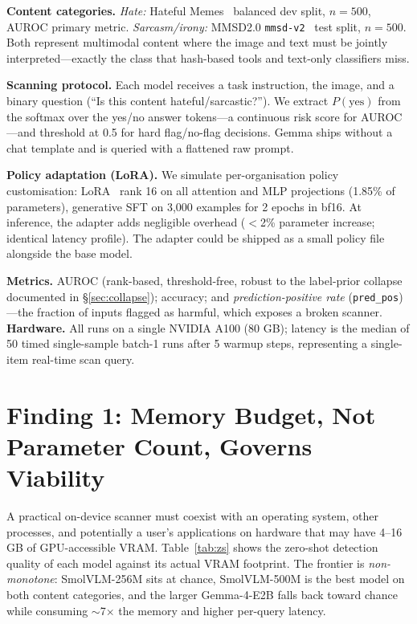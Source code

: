 \documentclass[sigconf,nonacm]{acmart}
\begin{document}
\textbf{Content categories.} \emph{Hate:} Hateful Memes~\cite{kiela2020hateful} balanced
dev split, $n{=}500$, AUROC primary metric. \emph{Sarcasm/irony:} MMSD2.0
\texttt{mmsd-v2}~\cite{qin2023mmsd2} test split, $n{=}500$. Both represent multimodal
content where the image and text must be jointly interpreted---exactly the class that
hash-based tools and text-only classifiers miss.

\textbf{Scanning protocol.} Each model receives a task instruction, the image, and a binary
question (``Is this content hateful/sarcastic?''). We extract $P(\text{yes})$ from the
softmax over the yes/no answer tokens---a continuous risk score for AUROC---and threshold
at 0.5 for hard flag/no-flag decisions. Gemma ships without a chat template and is queried
with a flattened raw prompt.

\textbf{Policy adaptation (LoRA).} We simulate per-organisation policy customisation:
LoRA~\cite{hu2022lora} rank 16 on all attention and MLP projections (1.85\% of parameters),
generative SFT on 3{,}000 examples for 2 epochs in bf16. At inference, the adapter adds
negligible overhead ($<$2\% parameter increase; identical latency profile). The adapter
could be shipped as a small policy file alongside the base model.

\textbf{Metrics.} AUROC (rank-based, threshold-free, robust to the label-prior collapse
documented in \S\ref{sec:collapse}); accuracy; and \emph{prediction-positive rate}
(\texttt{pred\_pos})---the fraction of inputs flagged as harmful, which exposes a broken
scanner. \textbf{Hardware.} All runs on a single NVIDIA A100 (80 GB); latency is the
median of 50 timed single-sample batch-1 runs after 5 warmup steps, representing a
single-item real-time scan query.

\section{Finding 1: Memory Budget, Not Parameter Count, Governs Viability}\label{sec:scale}
A practical on-device scanner must coexist with an operating system, other processes, and
potentially a user's applications on hardware that may have 4--16 GB of GPU-accessible
VRAM. Table~\ref{tab:zs} shows the zero-shot detection quality of each model against its
actual VRAM footprint. The frontier is \emph{non-monotone}: SmolVLM-256M sits at chance,
SmolVLM-500M is the best model on both content categories, and the larger Gemma-4-E2B
falls back toward chance while consuming $\sim$7$\times$ the memory and higher per-query
latency.
\end{document}
